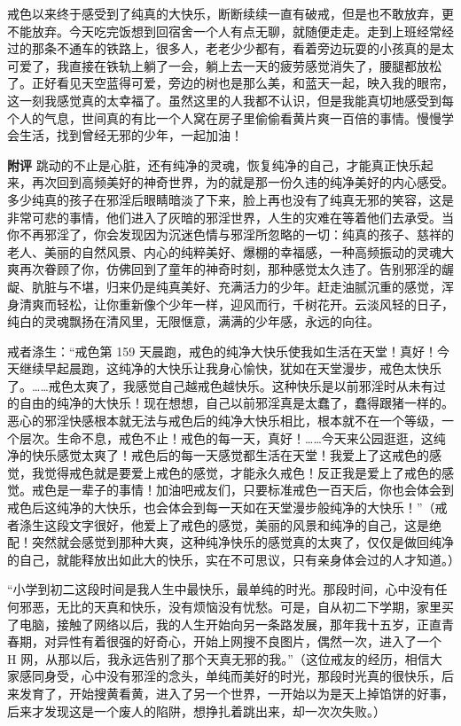 \begin{case}
    戒色以来终于感受到了纯真的大快乐，断断续续一直有破戒，但是也不敢放弃，更不能放弃。今天吃完饭想到回宿舍一个人有点无聊，就随便走走。走到上班经常经过的那条不通车的铁路上，很多人，老老少少都有，看着旁边玩耍的小孩真的是太可爱了，我直接在铁轨上躺了一会，躺上去一天的疲劳感觉消失了，腰腿都放松了。正好看见天空蓝得可爱，旁边的树也是那么美，和蓝天一起，映入我的眼帘，这一刻我感觉真的太幸福了。虽然这里的人我都不认识，但是我能真切地感受到每个人的气息，世间真的有比一个人窝在房子里偷偷看黄片爽一百倍的事情。慢慢学会生活，找到曾经无邪的少年，一起加油！

    \textbf{附评} 跳动的不止是心脏，还有纯净的灵魂，恢复纯净的自己，才能真正快乐起来，再次回到高频美好的神奇世界，为的就是那一份久违的纯净美好的内心感受。多少纯真的孩子在邪淫后眼睛暗淡了下来，脸上再也没有了纯真无邪的笑容，这是非常可悲的事情，他们进入了灰暗的邪淫世界，人生的灾难在等着他们去承受。当你不再邪淫了，你会发现因为沉迷色情与邪淫所忽略的一切：纯真的孩子、慈祥的老人、美丽的自然风景、内心的纯粹美好、爆棚的幸福感，一种高频振动的灵魂大爽再次眷顾了你，仿佛回到了童年的神奇时刻，那种感觉太久违了。告别邪淫的龌龊、肮脏与不堪，归来仍是纯真美好、充满活力的少年。赶走油腻沉重的感觉，浑身清爽而轻松，让你重新像个少年一样，迎风而行，千树花开。云淡风轻的日子，纯白的灵魂飘扬在清风里，无限惬意，满满的少年感，永远的向往。

    戒者涤生：“戒色第 159 天晨跑，戒色的纯净大快乐使我如生活在天堂！真好！今天继续早起晨跑，这纯净的大快乐让我身心愉快，犹如在天堂漫步，戒色太快乐了。……戒色太爽了，我感觉自己越戒色越快乐。这种快乐是以前邪淫时从未有过的自由的纯净的大快乐！现在想想，自己以前邪淫真是太蠢了，蠢得跟猪一样的。恶心的邪淫快感根本就无法与戒色后的纯净大快乐相比，根本就不在一个等级，一个层次。生命不息，戒色不止！戒色的每一天，真好！……今天来公园逛逛，这纯净的快乐感觉太爽了！戒色后的每一天感觉都生活在天堂！我爱上了这戒色的感觉，我觉得戒色就是要爱上戒色的感觉，才能永久戒色！反正我是爱上了戒色的感觉。戒色是一辈子的事情！加油吧戒友们，只要标准戒色一百天后，你也会体会到戒色后这纯净的大快乐，也会体会到每一天如在天堂漫步般纯净的大快乐！”（戒者涤生这段文字很好，他爱上了戒色的感觉，美丽的风景和纯净的自己，这是绝配！突然就会感觉到那种大爽，这种纯净快乐的感觉真的太爽了，仅仅是做回纯净的自己，就能释放出如此大的快乐，实在不可思议，只有亲身体会过的人才知道。）

    “小学到初二这段时间是我人生中最快乐，最单纯的时光。那段时间，心中没有任何邪恶，无比的天真和快乐，没有烦恼没有忧愁。可是，自从初二下学期，家里买了电脑，接触了网络以后，我的人生开始向另一条路发展，那年我十五岁，正直青春期，对异性有着很强的好奇心，开始上网搜不良图片，偶然一次，进入了一个 H 网，从那以后，我永远告别了那个天真无邪的我。”（这位戒友的经历，相信大家感同身受，心中没有邪淫的念头，单纯而美好的时光，那段时光真的很快乐，后来发育了，开始搜黄看黄，进入了另一个世界，一开始以为是天上掉馅饼的好事，后来才发现这是一个废人的陷阱，想挣扎着跳出来，却一次次失败。）


\end{case}
